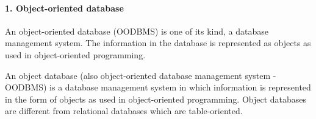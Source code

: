
\paragraph{1. Object-oriented database}
An object-oriented database (OODBMS) is one of its kind, a database management system.\cite{WiKiauthor2013} The information in the database is represented as objects as used in object-oriented programming.

An object database (also object-oriented database management system - OODBMS) is a database management system in which information is represented in the form of objects as used in object-oriented programming. Object databases are different from relational databases which are table-oriented.

